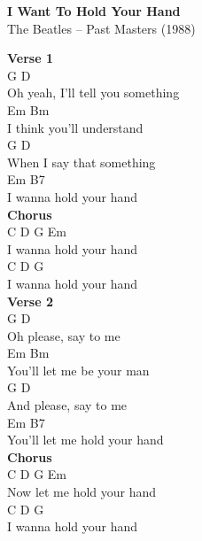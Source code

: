 \documentclass[a4paper]{article}
\begin{document}
    \begin{center}
        \textbf{I Want To Hold Your Hand}
        ~\\
        The Beatles -- Past Masters (1988)
    \end{center}
    {
        \scriptsize
        \textbf{Verse 1}
        ~\\
        {
            \cutive
            \obeyspaces
         G             D
\\
Oh yeah, I'll tell you something
\\
Em                   Bm
\\
 I think you'll understand
\\
     G          D
\\
When I say that something
\\
Em                 B7
\\
 I wanna hold your hand
\\

        }
        \textbf{Chorus}
        ~\\
        {
            \cutive
            \obeyspaces
C        D         G     Em
\\
 I wanna hold your hand
\\
C        D         G
\\
 I wanna hold your hand
\\

        }
        \textbf{Verse 2}
        ~\\
        {
            \cutive
            \obeyspaces
   G              D
\\
Oh please, say to me
\\
Em                     Bm
\\
 You'll let me be your man
\\
    G              D
\\
And please, say to me
\\
Em                       B7
\\
 You'll let me hold your hand
\\

        }
        \textbf{Chorus}
        ~\\
        {
            \cutive
            \obeyspaces
C           D         G  Em
\\
 Now let me hold your hand
\\
C        D         G
\\
 I wanna hold your hand
\\

}}
\end{document}
